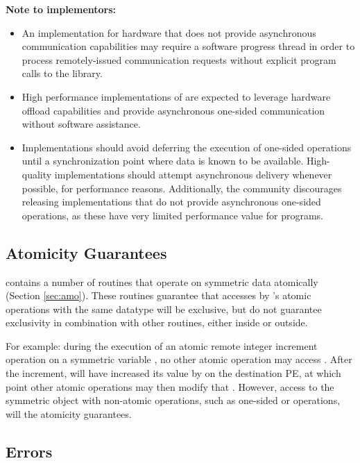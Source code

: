 \textbf{Note to implementors:}
\begin{itemize}
  \item An \openshmem implementation for hardware that does not provide
      asynchronous communication capabilities may require a software progress
      thread in order to process remotely-issued communication requests without
      explicit program calls to the \openshmem library.  
  \item High performance implementations of \openshmem are expected to leverage
      hardware offload capabilities and provide asynchronous one-sided
      communication without software assistance.
  \item Implementations should avoid deferring the execution of one-sided
      operations until a synchronization point where data is known to be
      available. High-quality implementations should attempt asynchronous delivery
      whenever possible, for performance reasons. Additionally, the \openshmem
      community discourages releasing \openshmem implementations that do not
      provide asynchronous one-sided operations, as these have very limited
      performance value for \openshmem programs.
\end{itemize}

\subsection{Atomicity Guarantees}\label{subsec:amo_guarantees}

\openshmem contains a number of routines that operate on symmetric data
atomically (Section \ref{sec:amo}).  These routines guarantee that accesses by
\openshmem's atomic operations with the same datatype will be exclusive, but do not guarantee
exclusivity in combination with other routines, either inside \openshmem or
outside.

For example: during the execution of an atomic remote integer increment
operation on a symmetric variable , no other \openshmem atomic operation
may access .  After the increment,  will have increased its value
by  on the destination \ac{PE}, at which point other atomic operations
may then modify that .  However, access to the symmetric object 
with non-atomic operations, such as one-sided  or  operations,
will  the atomicity guarantees.

\subsection{Errors}\label{sec:errors}

